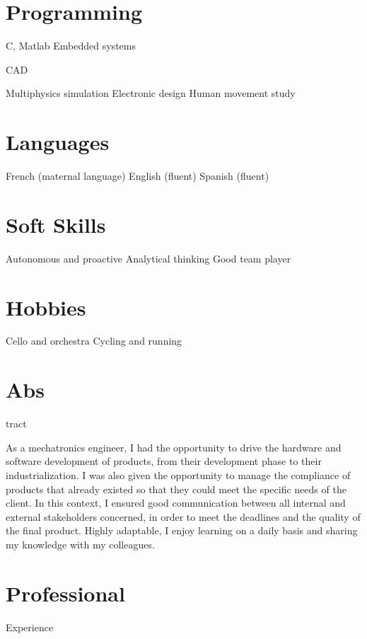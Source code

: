 \documentclass{cv-style}     %
\begin{document}
\begin{aside}
    \section{Programming}
    C, Matlab
    Embedded systems %

    CAD %

    Multiphysics simulation %
    Electronic design  %
    Human movement study %
    \section{Languages}
    French (maternal language)
    English (fluent)
    Spanish (fluent)
    \section{Soft Skills}
    Autonomous and proactive
    Analytical thinking
    Good team player
    \section{Hobbies}
    Cello and orchestra
    Cycling and running
\end{aside}

\section{Abs}{tract}

As a mechatronics engineer, I had the opportunity to drive the hardware and software development of products,
from their development phase to their industrialization. I was also given the opportunity to manage the compliance of products
that already existed so that they could meet the specific needs of the client.
In this context, I ensured good communication between all internal and external stakeholders concerned,
in order to meet the deadlines and the quality of the final product.
Highly adaptable, I enjoy learning on a daily basis and sharing my knowledge with my colleagues.

\section{Professional }{Experience}
\end{document}
